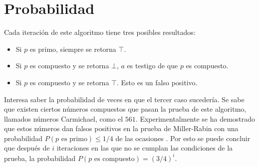\documentclass[paper=leter, fontsize=11pt]{scrartcl}
\numberwithin{equation}{section}		%
\numberwithin{figure}{section}			%
\numberwithin{table}{section}				%
\begin{document}
\section{Probabilidad}

Cada iteración de este algoritmo tiene tres posibles resultados:
\begin{itemize}
    \item Si $p$ es primo, siempre se retorna $\top$.
    \item Si $p$ es compuesto y se retorna $\bot$, $a$ es testigo de que $p$ es compuesto.
    \item Si $p$ es compuesto y se retorna $\top$. Esto es un falso positivo.
\end{itemize}

Interesa saber la probabilidad de veces en que el tercer caso sucedería. Se sabe que existen ciertos números compuestos que pasan la prueba de este algoritmo, llamados números Carmichael, como el $561$. Experimentalmente se ha demostrado que estos números dan falsos positivos en la prueba de Miller-Rabin con una probabilidad $P(p \text{ es primo}) \leq 1/4$ de las ocasiones \cite{primality_tests}. Por esto se puede concluir que después de $i$ iteraciones en las que no se cumplan las condiciones de la prueba, la probabilidad $P(p \text{ es compuesto}) = (3/4)^i$.



\end{document}
